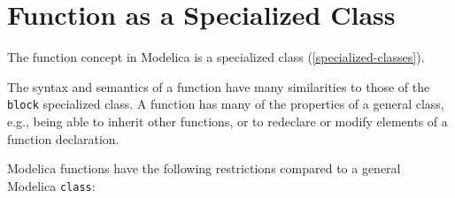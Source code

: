 \section{Function as a Specialized Class}\label{function-as-a-specialized-class}

The function concept in Modelica is a specialized class (\cref{specialized-classes}).

\begin{nonnormative}
The syntax and semantics of a function have many similarities to those of the \lstinline!block! specialized class. A function has many of the properties
of a general class, e.g., being able to inherit other functions, or to redeclare or modify elements of a function declaration.
\end{nonnormative}

Modelica functions have the following restrictions compared to a general
Modelica \lstinline!class!:

